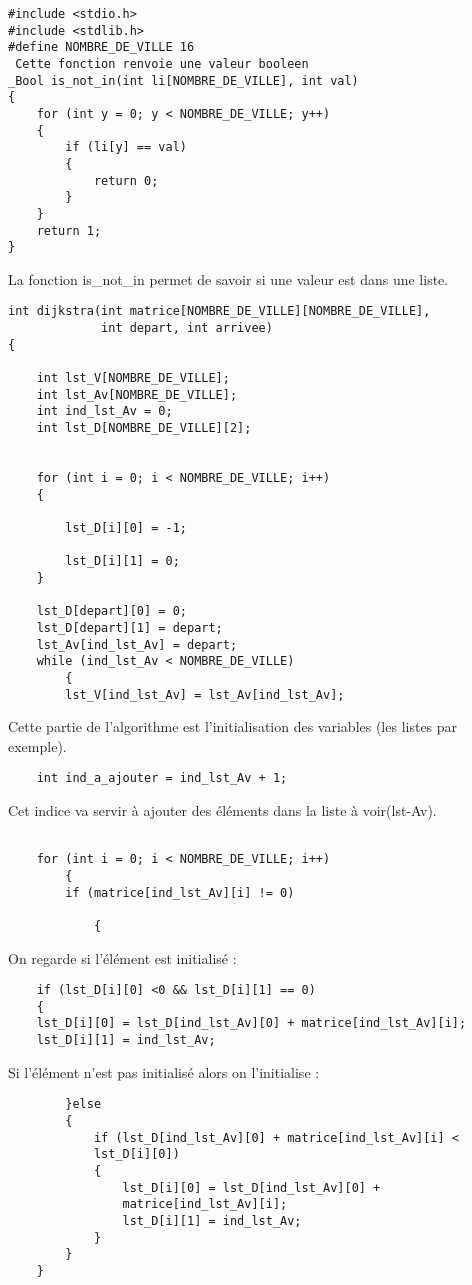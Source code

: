 \documentclass[a4paper, 12pt]{article}
\begin{document}
        \begin{lstlisting}
#include <stdio.h>
#include <stdlib.h>
#define NOMBRE_DE_VILLE 16
 Cette fonction renvoie une valeur booleen
_Bool is_not_in(int li[NOMBRE_DE_VILLE], int val)
{
    for (int y = 0; y < NOMBRE_DE_VILLE; y++)
    {
        if (li[y] == val)
        {
            return 0;
        }
    }
    return 1;
}
\end{lstlisting}La fonction is\_not\_in permet de savoir si une valeur est dans une liste. \begin{lstlisting}
int dijkstra(int matrice[NOMBRE_DE_VILLE][NOMBRE_DE_VILLE],
             int depart, int arrivee)
{

    int lst_V[NOMBRE_DE_VILLE];  
    int lst_Av[NOMBRE_DE_VILLE]; 
    int ind_lst_Av = 0;          
    int lst_D[NOMBRE_DE_VILLE][2];

   
    for (int i = 0; i < NOMBRE_DE_VILLE; i++)
    {
        
        lst_D[i][0] = -1;

        lst_D[i][1] = 0;
    }
   
    lst_D[depart][0] = 0;
    lst_D[depart][1] = depart;
    lst_Av[ind_lst_Av] = depart;
    while (ind_lst_Av < NOMBRE_DE_VILLE)
        {
        lst_V[ind_lst_Av] = lst_Av[ind_lst_Av];
     \end{lstlisting}
     Cette partie de l'algorithme est l'initialisation des variables (les listes par exemple).
     \begin{lstlisting}  
    int ind_a_ajouter = ind_lst_Av + 1;\end{lstlisting}
    Cet indice va servir à ajouter des éléments dans la liste à voir(lst-Av).
    \newline
\begin{lstlisting}

    for (int i = 0; i < NOMBRE_DE_VILLE; i++)
        {
        if (matrice[ind_lst_Av][i] != 0)
    
            {
    \end{lstlisting} On regarde si l'élément est initialisé : \begin{lstlisting}
    if (lst_D[i][0] <0 && lst_D[i][1] == 0)
    {
    lst_D[i][0] = lst_D[ind_lst_Av][0] + matrice[ind_lst_Av][i];
    lst_D[i][1] = ind_lst_Av;
    \end{lstlisting}Si l'élément n'est pas initialisé alors on l'initialise : \begin{lstlisting}
        }else
        {
            if (lst_D[ind_lst_Av][0] + matrice[ind_lst_Av][i] < 
            lst_D[i][0])
            {
                lst_D[i][0] = lst_D[ind_lst_Av][0] + 
                matrice[ind_lst_Av][i];
                lst_D[i][1] = ind_lst_Av;
            }
        }
    }
    \end{lstlisting}
\end{document}
